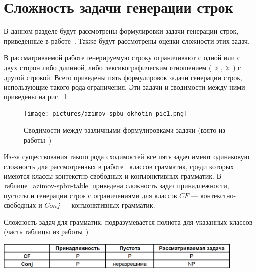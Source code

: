 \section{Сложность задачи генерации строк}
В данном разделе будут рассмотрены формулировки задачи генерации строк, приведенные в работе~\cite{azimov-spbu-Okhotin}. Также будут рассмотрены оценки сложности этих задач.

В рассматриваемой работе генерируемую строку ограничивают с одной или с двух сторон либо длинной, либо лексикографическим отношением ($\preceq, \succeq$) с другой строкой. Всего приведены пять формулировок задачи генерации строк, использующие такого рода ограничения. Эти задачи и сводимости между ними приведены на рис.~\ref{azimov-spbu-tasks}.

\begin{figure}[h!]
 \centering
 \texttt{[image: pictures/azimov-spbu-okhotin\_pic1.png]}
 \caption{Сводимости между различными формулировками задачи (взято из работы~\cite{azimov-spbu-Okhotin})}
 \label{azimov-spbu-tasks}
\end{figure}

Из-за существования такого рода сходимостей все пять задач имеют одинаковую сложность для рассмотренных в работе~\cite{azimov-spbu-Okhotin} классов грамматик, среди которых имеются классы контекстно-свободных и конъюнктивных грамматик. В таблице~\ref{azimov-spbu-table} приведена сложность задач принадлежности, пустоты и генерации строк с ограничениями для классов $CF$ --- контекстно-свободных и $Conj$ --- конъюнктивных грамматик.

\begin{table}[h!]
 \centering
  \caption{Сложность задач для грамматик, подразумевается полнота
для указанных классов (часть таблицы из работы~\cite{azimov-spbu-Okhotin})}
 \includegraphics[width=12cm]{pictures/azimov-spbu-okhotin_tab1.png}
 \label{azimov-spbu-table}
\end{table}
